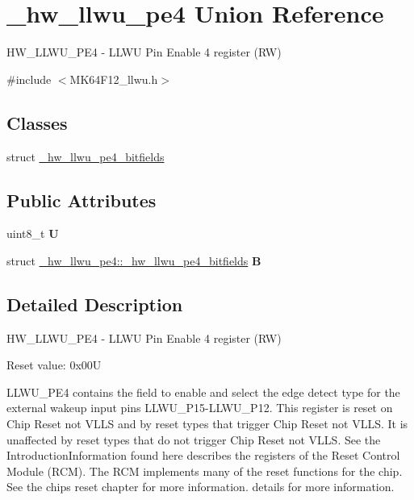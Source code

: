 \hypertarget{union__hw__llwu__pe4}{}\section{\+\_\+hw\+\_\+llwu\+\_\+pe4 Union Reference}
\label{union__hw__llwu__pe4}


H\+W\+\_\+\+L\+L\+W\+U\+\_\+\+P\+E4 -\/ L\+L\+WU Pin Enable 4 register (RW)  




{\ttfamily \#include $<$M\+K64\+F12\+\_\+llwu.\+h$>$}

\subsection*{Classes}
\begin{DoxyCompactItemize}
\item 
struct \hyperlink{struct__hw__llwu__pe4_1_1__hw__llwu__pe4__bitfields}{\+\_\+hw\+\_\+llwu\+\_\+pe4\+\_\+bitfields}
\end{DoxyCompactItemize}
\subsection*{Public Attributes}
\begin{DoxyCompactItemize}
\item 
uint8\+\_\+t {\bfseries U}\hypertarget{union__hw__llwu__pe4_a7c95cc0b67ede1ed25400f798abcd646}{}\label{union__hw__llwu__pe4_a7c95cc0b67ede1ed25400f798abcd646}

\item 
struct \hyperlink{struct__hw__llwu__pe4_1_1__hw__llwu__pe4__bitfields}{\+\_\+hw\+\_\+llwu\+\_\+pe4\+::\+\_\+hw\+\_\+llwu\+\_\+pe4\+\_\+bitfields} {\bfseries B}\hypertarget{union__hw__llwu__pe4_abc795e4d64dca0aad252a809f0d221f5}{}\label{union__hw__llwu__pe4_abc795e4d64dca0aad252a809f0d221f5}

\end{DoxyCompactItemize}


\subsection{Detailed Description}
H\+W\+\_\+\+L\+L\+W\+U\+\_\+\+P\+E4 -\/ L\+L\+WU Pin Enable 4 register (RW) 

Reset value\+: 0x00U

L\+L\+W\+U\+\_\+\+P\+E4 contains the field to enable and select the edge detect type for the external wakeup input pins L\+L\+W\+U\+\_\+\+P15-\/\+L\+L\+W\+U\+\_\+\+P12. This register is reset on Chip Reset not V\+L\+LS and by reset types that trigger Chip Reset not V\+L\+LS. It is unaffected by reset types that do not trigger Chip Reset not V\+L\+LS. See the Introduction\+Information found here describes the registers of the Reset Control Module (R\+CM). The R\+CM implements many of the reset functions for the chip. See the chip\textquotesingle{}s reset chapter for more information. details for more information. 

